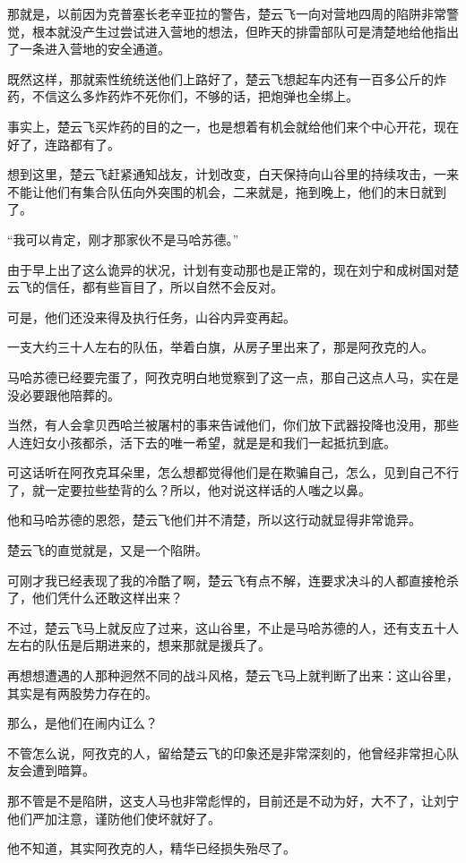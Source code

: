 那就是，以前因为克普塞长老辛亚拉的警告，楚云飞一向对营地四周的陷阱非常警觉，根本就没产生过尝试进入营地的想法，但昨天的排雷部队可是清楚地给他指出了一条进入营地的安全通道。

既然这样，那就索性统统送他们上路好了，楚云飞想起车内还有一百多公斤的炸药，不信这么多炸药炸不死你们，不够的话，把炮弹也全绑上。

事实上，楚云飞买炸药的目的之一，也是想着有机会就给他们来个中心开花，现在好了，连路都有了。

想到这里，楚云飞赶紧通知战友，计划改变，白天保持向山谷里的持续攻击，一来不能让他们有集合队伍向外突围的机会，二来就是，拖到晚上，他们的末日就到了。

“我可以肯定，刚才那家伙不是马哈苏德。”

由于早上出了这么诡异的状况，计划有变动那也是正常的，现在刘宁和成树国对楚云飞的信任，都有些盲目了，所以自然不会反对。

可是，他们还没来得及执行任务，山谷内异变再起。

一支大约三十人左右的队伍，举着白旗，从房子里出来了，那是阿孜克的人。

马哈苏德已经要完蛋了，阿孜克明白地觉察到了这一点，那自己这点人马，实在是没必要跟他陪葬的。

当然，有人会拿贝西哈兰被屠村的事来告诫他们，你们放下武器投降也没用，那些人连妇女小孩都杀，活下去的唯一希望，就是是和我们一起抵抗到底。

可这话听在阿孜克耳朵里，怎么想都觉得他们是在欺骗自己，怎么，见到自己不行了，就一定要拉些垫背的么？所以，他对说这样话的人嗤之以鼻。

他和马哈苏德的恩怨，楚云飞他们并不清楚，所以这行动就显得非常诡异。

楚云飞的直觉就是，又是一个陷阱。

可刚才我已经表现了我的冷酷了啊，楚云飞有点不解，连要求决斗的人都直接枪杀了，他们凭什么还敢这样出来？

不过，楚云飞马上就反应了过来，这山谷里，不止是马哈苏德的人，还有支五十人左右的队伍是后期进来的，想来那就是援兵了。

再想想遭遇的人那种迥然不同的战斗风格，楚云飞马上就判断了出来：这山谷里，其实是有两股势力存在的。

那么，是他们在闹内讧么？

不管怎么说，阿孜克的人，留给楚云飞的印象还是非常深刻的，他曾经非常担心队友会遭到暗算。

那不管是不是陷阱，这支人马也非常彪悍的，目前还是不动为好，大不了，让刘宁他们严加注意，谨防他们使坏就好了。

他不知道，其实阿孜克的人，精华已经损失殆尽了。

